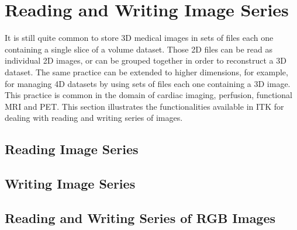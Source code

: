 %


\section{Reading and Writing Image Series}

It is still quite common to store 3D medical images in sets of files each one
containing a single slice of a volume dataset. Those 2D files can be read as
individual 2D images, or can be grouped together in order to reconstruct a 3D
dataset. The same practice can be extended to higher dimensions, for example,
for managing 4D datasets by using sets of files each one containing a 3D image.
This practice is common in the domain of cardiac imaging, perfusion, functional
MRI and PET. This section illustrates the functionalities available in ITK for
dealing with reading and writing series of images.


\subsection{Reading Image Series}
\label{sec:ReadingImageSeries}
%

\subsection{Writing Image Series}
\label{sec:WritingImageSeries}
%

\subsection{Reading and Writing Series of RGB Images}
\label{sec:ReadingWritingRGBImageSeries}
%



